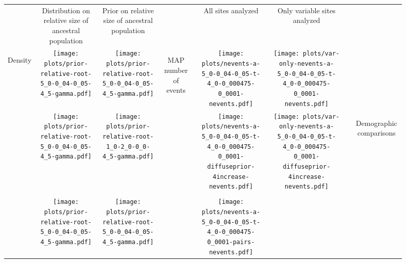 \documentclass[border=10pt,varwidth=30cm]{standalone}
\begin{document}
\begin{figure}
    \setlength\arrayrulewidth{2pt}
    \centering
    \begin{tabular}{@{}cccccccc@{}}
        & \multirow{1}{0.15\textwidth}{\centering\Large Distribution on relative size of ancestral population}
        & \multirow{1}{0.15\textwidth}{\centering\Large Prior on relative size of ancestral population}
        &
        & \multirow{1}{0.15\textwidth}{\centering\Large All sites analyzed}
        & \multirow{1}{0.15\textwidth}{\centering\Large Only variable sites analyzed}
        & 
        & \\[9ex]
        \multirow{5}{*}[-8em]{\begin{sideways}\large Density\end{sideways}}
        & \texttt{[image: plots/prior-relative-root-5\_0-0\_04-0\_05-4\_5-gamma.pdf]}
        & \texttt{[image: plots/prior-relative-root-5\_0-0\_04-0\_05-4\_5-gamma.pdf]}
        & \multirow{5}{*}[-4em]{\begin{sideways}\large MAP number of events\end{sideways}}
        & \texttt{[image: plots/nevents-a-5\_0-0\_04-0\_05-t-4\_0-0\_000475-0\_0001-nevents.pdf]}
        & \texttt{[image: plots/var-only-nevents-a-5\_0-0\_04-0\_05-t-4\_0-0\_000475-0\_0001-nevents.pdf]} 
        & \multicolumn{1}{c|}{} 
        & \\
        & \texttt{[image: plots/prior-relative-root-5\_0-0\_04-0\_05-4\_5-gamma.pdf]}
        & \texttt{[image: plots/prior-relative-root-1\_0-2\_0-0\_0-4\_5-gamma.pdf]}
        &
        & \texttt{[image: plots/nevents-a-5\_0-0\_04-0\_05-t-4\_0-0\_000475-0\_0001-diffuseprior-4increase-nevents.pdf]}
        & \texttt{[image: plots/var-only-nevents-a-5\_0-0\_04-0\_05-t-4\_0-0\_000475-0\_0001-diffuseprior-4increase-nevents.pdf]}
        & \multicolumn{1}{c|}{} 
        & \multirow{5}{*}[17em]{\begin{sideways}\Large Demographic comparisons\end{sideways}} \\
        & & & & & & & \\
        & \texttt{[image: plots/prior-relative-root-5\_0-0\_04-0\_05-4\_5-gamma.pdf]}
        & \texttt{[image: plots/prior-relative-root-5\_0-0\_04-0\_05-4\_5-gamma.pdf]}
        &
        & \texttt{[image: plots/nevents-a-5\_0-0\_04-0\_05-t-4\_0-0\_000475-0\_0001-pairs-nevents.pdf]}

\end{tabular}
\end{figure}
\end{document}
